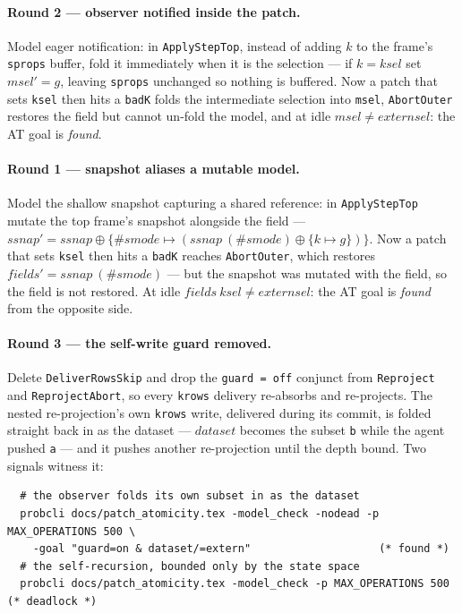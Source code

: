 \documentclass[a4paper,10pt,fleqn]{article}
\begin{document}
\paragraph{Round 2 --- observer notified inside the patch.}
Model eager notification: in \texttt{ApplyStepTop}, instead of adding $k$ to the
frame's \texttt{sprops} buffer, fold it immediately when it is the selection ---
if $k = ksel$ set $msel' = g$, leaving \texttt{sprops} unchanged so nothing is
buffered.  Now a patch that sets \texttt{ksel} then hits a \texttt{badK} folds the
intermediate selection into \texttt{msel}, \texttt{AbortOuter} restores the field
but cannot un-fold the model, and at idle $msel \neq externsel$: the AT goal is
\emph{found}.

\paragraph{Round 1 --- snapshot aliases a mutable model.}
Model the shallow snapshot capturing a shared reference: in \texttt{ApplyStepTop}
mutate the top frame's snapshot alongside the field ---
$ssnap' = ssnap \oplus \{ \# smode \mapsto (ssnap~(\# smode) \oplus \{ k \mapsto g \}) \}$.
Now a patch that sets \texttt{ksel} then hits a \texttt{badK} reaches
\texttt{AbortOuter}, which restores $fields' = ssnap~(\# smode)$ --- but the
snapshot was mutated with the field, so the field is not restored.  At idle
$fields~ksel \neq externsel$: the AT goal is \emph{found} from the opposite side.

\paragraph{Round 3 --- the self-write guard removed.}
Delete \texttt{DeliverRowsSkip} and drop the \texttt{guard = off} conjunct from
\texttt{Reproject} and \texttt{ReprojectAbort}, so every \texttt{krows} delivery
re-absorbs and re-projects.  The nested re-projection's own \texttt{krows} write,
delivered during its commit, is folded straight back in as the dataset ---
$dataset$ becomes the subset \texttt{b} while the agent pushed \texttt{a} --- and
it pushes another re-projection until the depth bound.  Two signals witness it:
\begin{verbatim}
  # the observer folds its own subset in as the dataset
  probcli docs/patch_atomicity.tex -model_check -nodead -p MAX_OPERATIONS 500 \
    -goal "guard=on & dataset/=extern"                    (* found *)
  # the self-recursion, bounded only by the state space
  probcli docs/patch_atomicity.tex -model_check -p MAX_OPERATIONS 500  (* deadlock *)
\end{verbatim}
\end{document}
